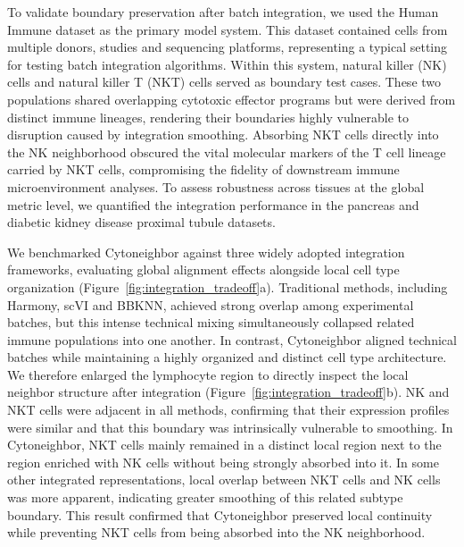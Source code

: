 \documentclass[11pt]{article}
\begin{document}
To validate boundary preservation after batch integration, we used the Human Immune dataset\cite{Villani2017Immune} as the primary model system. This dataset contained cells from multiple donors, studies and sequencing platforms, representing a typical setting for testing batch integration algorithms. Within this system, natural killer (NK) cells and natural killer T (NKT) cells served as boundary test cases. These two populations shared overlapping cytotoxic effector programs but were derived from distinct immune lineages, rendering their boundaries highly vulnerable to disruption caused by integration smoothing. Absorbing NKT cells directly into the NK neighborhood obscured the vital molecular markers of the T cell lineage carried by NKT cells, compromising the fidelity of downstream immune microenvironment analyses. To assess robustness across tissues at the global metric level, we quantified the integration performance in the pancreas and diabetic kidney disease proximal tubule datasets.

We benchmarked Cytoneighbor against three widely adopted integration frameworks, evaluating global alignment effects alongside local cell type organization (Figure~\ref{fig:integration_tradeoff}a). Traditional methods, including Harmony\cite{Korsunsky2019Harmony}, scVI\cite{Lopez2018scVI} and BBKNN\cite{Polanski2020BBKNN}, achieved strong overlap among experimental batches, but this intense technical mixing simultaneously collapsed related immune populations into one another. In contrast, Cytoneighbor aligned technical batches while maintaining a highly organized and distinct cell type architecture. We therefore enlarged the lymphocyte region to directly inspect the local neighbor structure after integration (Figure~\ref{fig:integration_tradeoff}b). NK and NKT cells were adjacent in all methods, confirming that their expression profiles were similar and that this boundary was intrinsically vulnerable to smoothing. In Cytoneighbor, NKT cells mainly remained in a distinct local region next to the region enriched with NK cells without being strongly absorbed into it. In some other integrated representations, local overlap between NKT cells and NK cells was more apparent, indicating greater smoothing of this related subtype boundary. This result confirmed that Cytoneighbor preserved local continuity while preventing NKT cells from being absorbed into the NK neighborhood.
\end{document}
